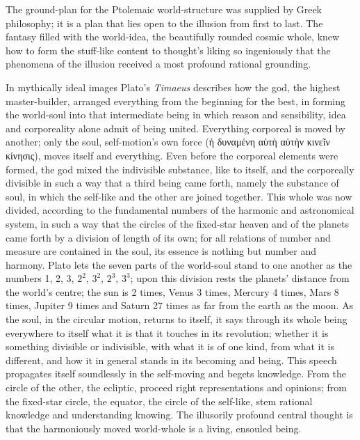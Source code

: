 \documentclass[12pt,a4paper]{book}
\begin{document}
The ground-plan for the Ptolemaic world-structure was supplied by Greek philosophy; it is a plan that
lies open to the illusion from first to last. The fantasy filled with the world-idea, the beautifully
rounded cosmic whole, knew how to form the stuff-like content to thought's liking so ingeniously that
the phenomena of the illusion received a most profound rational grounding.

In mythically ideal images Plato's \textit{Timaeus} describes how the god, the highest master-builder,
arranged everything from the beginning for the best, in forming the world-soul into that intermediate
being in which reason and sensibility, idea and corporeality alone admit of being united. Everything
corporeal is moved by another; only the soul, self-motion's own
force (ἡ δυναμένη αὐτὴ αὑτὴν κινεῖν κίνησις), moves itself and everything. Even before the corporeal
elements were formed, the god mixed the indivisible substance, like to itself, and the corporeally
divisible in such a way that a third being came forth, namely the substance of soul, in which the
self-like and the other are joined together. This whole was now divided, according to the fundamental
numbers of the harmonic and astronomical system, in such a way that the circles of the fixed-star
heaven and of the planets came forth by a division of length of its own; for all relations of number
and measure are contained in the soul, its essence is nothing but number and harmony. Plato lets the
seven parts of the world-soul stand to one another as the numbers 1, 2, 3, $2^2$, $3^2$, $2^3$, $3^3$;
upon this division rests the planets' distance from the world's centre; the sun is 2 times, Venus 3
times, Mercury 4 times, Mars 8 times, Jupiter 9 times and Saturn 27 times as far from the earth as the
moon. As the soul, in the circular motion, returns to itself, it says through its whole being
everywhere to itself what it is that it touches in its revolution; whether it is something divisible or
indivisible, with what it is of one kind, from what it is different, and how it in general stands in
its becoming and being. This speech propagates itself soundlessly in the self-moving and begets
knowledge. From the circle of the other, the ecliptic, proceed right representations and opinions; from
the fixed-star circle, the equator, the circle of the self-like, stem rational knowledge and
understanding knowing. The illusorily profound central thought is that the harmoniously moved
world-whole is a living, ensouled being.
\end{document}
